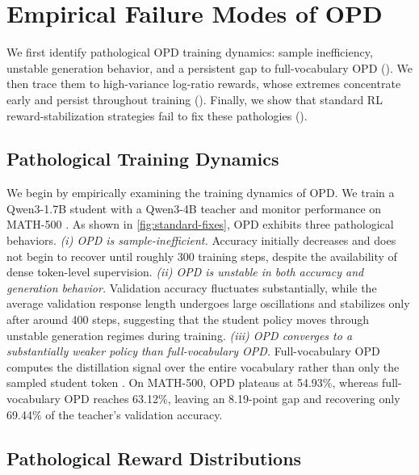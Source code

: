 \section{Empirical Failure Modes of OPD}
\label{sec:failure-modes}

We first identify pathological OPD training dynamics: sample inefficiency, unstable generation behavior, and a persistent gap to full-vocabulary OPD (). We then trace them to high-variance log-ratio rewards, whose extremes concentrate early and persist throughout training (). Finally, we show that standard RL reward-stabilization strategies fail to fix these pathologies ().

\subsection{Pathological Training Dynamics}
\label{subsec:training-dynamics}

We begin by empirically examining the training dynamics of OPD. We train a Qwen3-1.7B student with a Qwen3-4B teacher and monitor performance on \textsc{MATH-500}  \citep{hendrycks2021math}. As shown in \autoref{fig:standard-fixes}, OPD exhibits three pathological behaviors. \emph{(i) OPD is sample-inefficient.} Accuracy initially decreases and does not begin to recover until roughly 300 training steps, despite the availability of dense token-level supervision. \emph{(ii) OPD is unstable in both accuracy and generation behavior.} Validation accuracy fluctuates substantially, while the average validation response length undergoes large oscillations and stabilizes only after around 400 steps, suggesting that the student policy moves through unstable generation regimes during training. \emph{(iii) OPD converges to a substantially weaker policy than full-vocabulary OPD.}
Full-vocabulary OPD computes the distillation signal over the entire vocabulary rather than only the sampled student token \citep{zhao2026decouplingkltrajectoriesunified}. On \textsc{MATH-500}, OPD plateaus at 54.93\%, whereas full-vocabulary OPD reaches 63.12\%, leaving an 8.19-point gap and recovering only 69.44\% of the teacher's validation accuracy.



\subsection{Pathological Reward Distributions}
\label{subsec:high-variance}

